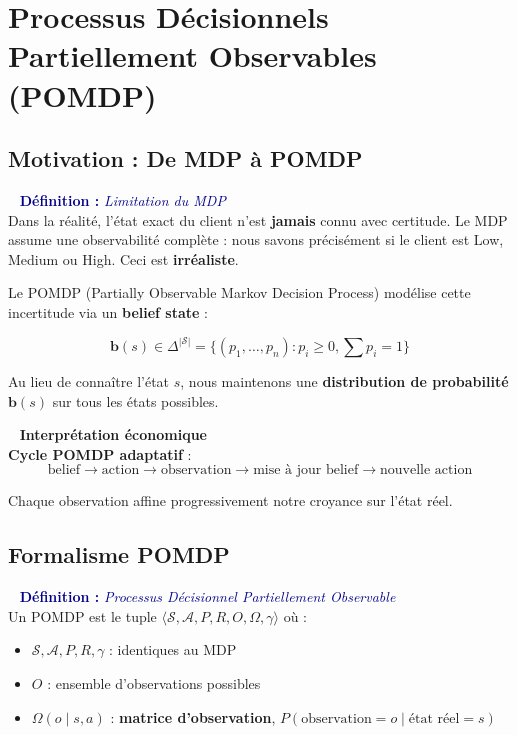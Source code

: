 \documentclass[11pt,a4paper]{article}
\newenvironment{defbox}[1]{%
  \vspace{3pt}\begin{framed}
  \noindent{\color{NavyBlue}\rule{0.3cm}{3pt}}~%
  \textcolor{DarkBlue}{\textbf{Définition :} \textit{#1}}\\[3pt]}
  {\end{framed}\vspace{3pt}}
\newenvironment{insightbox}{%
  \vspace{3pt}\begin{framed}
  \noindent{\color{NavyBlue}\rule{0.3cm}{3pt}}~%
  \textcolor{NavyBlue}{\textbf{Interprétation économique}}\\[3pt]}
  {\end{framed}\vspace{3pt}}
\begin{document}
\newpage
\section{Processus Décisionnels Partiellement Observables (POMDP)}
 
\subsection{Motivation : De MDP à POMDP}
 
\begin{defbox}{Limitation du MDP}
Dans la réalité, l'état exact du client n'est \textbf{jamais} connu avec certitude. Le MDP assume une observabilité complète : nous savons précisément si le client est Low, Medium ou High. Ceci est \textbf{irréaliste}.
\end{defbox}
 
Le POMDP (Partially Observable Markov Decision Process) modélise cette incertitude via un \textbf{belief state} :
 
\begin{equation}
\mathbf{b}(s) \in \Delta^{|\mathcal{S}|} = \{(p_1, \ldots, p_n) : p_i \geq 0, \sum p_i = 1\}
\end{equation}
 
Au lieu de connaître l'état $s$, nous maintenons une \textbf{distribution de probabilité} $\mathbf{b}(s)$ sur tous les états possibles.
 
\begin{insightbox}
\textbf{Cycle POMDP adaptatif} :
$$\text{belief} \to \text{action} \to \text{observation} \to \text{mise à jour belief} \to \text{nouvelle action}$$
 
Chaque observation affine progressivement notre croyance sur l'état réel.
\end{insightbox}
 
\subsection{Formalisme POMDP}
 
\begin{defbox}{Processus Décisionnel Partiellement Observable}
Un POMDP est le tuple $\langle \mathcal{S}, \mathcal{A}, P, R, O, \Omega, \gamma \rangle$ où :
\begin{itemize}
  \item $\mathcal{S}, \mathcal{A}, P, R, \gamma$ : identiques au MDP
  \item $O$ : ensemble d'observations possibles
  \item $\Omega(o \mid s, a)$ : \textbf{matrice d'observation}, $P(\text{observation} = o \mid \text{état réel} = s)$
\end{itemize}
\end{defbox}
 
\end{document}
